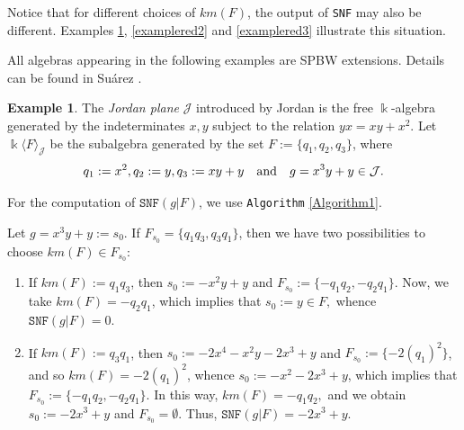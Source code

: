 \documentclass{amsart}
\theoremstyle{definition}
\newtheorem{example}[theorem]{Example}
\theoremstyle{remark}
\numberwithin{equation}{section}
\begin{document}
Notice that for different choices of $km(F)$, the output of \texttt{SNF} may also be different. Examples \ref{examplered}, \ref{examplered2} and \ref{examplered3} illustrate this situation.

All algebras appearing in the following examples are SPBW extensions. Details can be found in Su\'arez \cite[Chapter 1]{SuarezPhDThesis2023}.

\begin{example}\label{examplered}
The {\em Jordan plane} $\mathcal{J}$ introduced by Jordan \cite{Jordan2001} is the free $\Bbbk$-algebra generated by the indeterminates $x,y$ subject to the relation $yx = xy + x^2$. Let $\Bbbk\langle F\rangle_{\mathcal{J}}$ be the subalgebra generated by the set $F:=\{q_1, q_2, q_3\}$, where 
$$
q_1:= x^2, q_2:= y, q_3:= xy+y \quad {\rm and} \quad g = x^3y+y\in \mathcal{J}.
$$

For the computation of $\texttt{SNF}(g | F)$, we use \texttt{Algorithm} \ref{Algorithm1}. 

Let $g=x^3y+y:=s_0$. If $F_{s_0}=\{q_1q_3,q_3q_1\}$, then we have two possibilities to choose $km(F) \in F_{s_0}$:
\begin{enumerate}
\item [\rm (i)] If $km(F):= q_1q_3$, then $s_0:=-x^2y+y$ and $F_{s_0}:=\{-q_1q_2,-q_2q_1\}$. Now, we take $km(F)=-q_2q_1$, which implies that $s_0:=y\in F,$ whence $\texttt{SNF}(g | F)=0$.
\item [\rm (ii)] If $km(F):= q_3q_1$, then $s_0:=-2x^4-x^2y-2x^3+y$ and $F_{s_0}:=\{-2(q_1)^2\}$, and so $km(F)=-2(q_1)^2$, whence $s_0:=-x^2-2x^3+y$, which implies that $F_{s_0}:=\{-q_1q_2,-q_2q_1\}.$ In this way, $km(F)=-q_1q_2,$ and we obtain $s_0:=-2x^3+y$ and $F_{s_0}=\emptyset.$ Thus, $\texttt{SNF}(g | F)=-2x^3+y.$
\end{enumerate}
\end{example}
\end{document}

